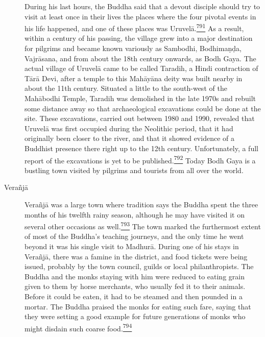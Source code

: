\begin{description}
During his last hours, the Buddha said that a devout disciple should try
to visit at least once in their lives the places where the four pivotal
events in his life happened, and one of these places was
Uruvelā.\label{footprints_split_019.html_fnref791}\hyperref[footprints_split_025.htmlux5cux23fn791]{\textsuperscript{791}}
As a result, within a century of his passing, the village grew into a
major destination for pilgrims and became known variously as Sambodhi,
Bodhimaṇḍa, Vajrāsana, and from about the 18{th} century onwards, as
Bodh Gaya. The actual village of Uruvelā came to be called Taradih, a
Hindi contraction of Tārā Devi, after a temple to this Mahāyāna deity
was built nearby in about the 11{th} century. Situated a little to the
south-west of the Mahābodhi Temple, Taradih was demolished in the late
1970s and rebuilt some distance away so that archaeological excavations
could be done at the site. These excavations, carried out between 1980
and 1990, revealed that Uruvelā was first occupied during the Neolithic
period, that it had originally been closer to the river, and that it
showed evidence of a Buddhist presence there right up to the 12{th}
century. Unfortunately, a full report of the excavations is yet to be
published.\label{footprints_split_019.html_fnref792}\hyperref[footprints_split_025.htmlux5cux23fn792]{\textsuperscript{792}}
Today Bodh Gaya is a bustling town visited by pilgrims and tourists from
all over the world.
\item[Verañjā]
Verañjā was a large town where tradition says the Buddha spent the three
months of his twelfth rainy season, although he may have visited it on
several other occasions as
well.\label{footprints_split_019.html_fnref793}\hyperref[footprints_split_025.htmlux5cux23fn793]{\textsuperscript{793}}
The town marked the furthermost extent of most of the Buddha's teaching
journeys, and the only time he went beyond it was his single visit to
Madhurā. During one of his stays in Verañjā, there was a famine in the
district, and food tickets were being issued, probably by the town
council, guilds or local philanthropists. The Buddha and the monks
staying with him were reduced to eating grain given to them by horse
merchants, who usually fed it to their animals. Before it could be
eaten, it had to be steamed and then pounded in a mortar. The Buddha
praised the monks for eating such fare, saying that they were setting a
good example for future generations of monks who might disdain such
coarse
food.\label{footprints_split_019.html_fnref794}\hyperref[footprints_split_025.htmlux5cux23fn794]{\textsuperscript{794}}

\end{description}
